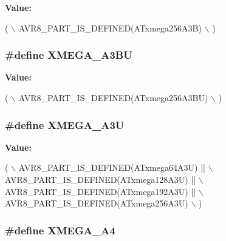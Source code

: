 {\bfseries Value\-:}
\begin{DoxyCode}
( \(\backslash\)
                AVR8\_PART\_IS\_DEFINED(ATxmega256A3B) \(\backslash\)
                )
\end{DoxyCode}
\hypertarget{group__xmega__part__macros__group_ga98083f3307fe61cc2377948db87cd708}{
\subsubsection[{X\-M\-E\-G\-A\-\_\-\-A3\-B\-U}]{\setlength{\rightskip}{0pt plus 5cm}\#define X\-M\-E\-G\-A\-\_\-\-A3\-B\-U}}\label{group__xmega__part__macros__group_ga98083f3307fe61cc2377948db87cd708}
{\bfseries Value\-:}
\begin{DoxyCode}
( \(\backslash\)
                AVR8\_PART\_IS\_DEFINED(ATxmega256A3BU) \(\backslash\)
                )
\end{DoxyCode}
\hypertarget{group__xmega__part__macros__group_gab5232598231cc5c17658e4b7cc5293ec}{
\subsubsection[{X\-M\-E\-G\-A\-\_\-\-A3\-U}]{\setlength{\rightskip}{0pt plus 5cm}\#define X\-M\-E\-G\-A\-\_\-\-A3\-U}}\label{group__xmega__part__macros__group_gab5232598231cc5c17658e4b7cc5293ec}
{\bfseries Value\-:}
\begin{DoxyCode}
( \(\backslash\)
                AVR8\_PART\_IS\_DEFINED(ATxmega64A3U)  || \(\backslash\)
                AVR8\_PART\_IS\_DEFINED(ATxmega128A3U) || \(\backslash\)
                AVR8\_PART\_IS\_DEFINED(ATxmega192A3U) || \(\backslash\)
                AVR8\_PART\_IS\_DEFINED(ATxmega256A3U) \(\backslash\)
                )
\end{DoxyCode}
\hypertarget{group__xmega__part__macros__group_ga7b83a133489c9896dbdc730615c83be8}{
\subsubsection[{X\-M\-E\-G\-A\-\_\-\-A4}]{\setlength{\rightskip}{0pt plus 5cm}\#define X\-M\-E\-G\-A\-\_\-\-A4}}\label{group__xmega__part__macros__group_ga7b83a133489c9896dbdc730615c83be8}
